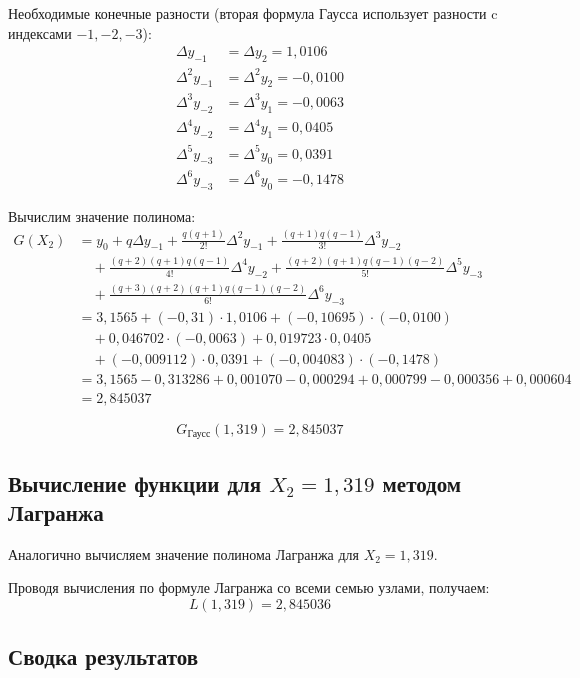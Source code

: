 Необходимые конечные разности (вторая формула Гаусса использует разности c индексами $-1, -2, -3$):
\begin{align*}
\Delta y_{-1} &= \Delta y_2 = 1{,}0106 \\
\Delta^2 y_{-1} &= \Delta^2 y_2 = -0{,}0100 \\
\Delta^3 y_{-2} &= \Delta^3 y_1 = -0{,}0063 \\
\Delta^4 y_{-2} &= \Delta^4 y_1 = 0{,}0405 \\
\Delta^5 y_{-3} &= \Delta^5 y_0 = 0{,}0391 \\
\Delta^6 y_{-3} &= \Delta^6 y_0 = -0{,}1478
\end{align*}

Вычислим значение полинома:
\begin{align*}
G(X_2) &= y_0 + q\Delta y_{-1} + \frac{q(q+1)}{2!}\Delta^2 y_{-1} + \frac{(q+1)q(q-1)}{3!}\Delta^3 y_{-2} \\
&\quad + \frac{(q+2)(q+1)q(q-1)}{4!}\Delta^4 y_{-2} + \frac{(q+2)(q+1)q(q-1)(q-2)}{5!}\Delta^5 y_{-3} \\
&\quad + \frac{(q+3)(q+2)(q+1)q(q-1)(q-2)}{6!}\Delta^6 y_{-3} \\
&= 3{,}1565 + (-0{,}31) \cdot 1{,}0106 + (-0{,}10695) \cdot (-0{,}0100) \\
&\quad + 0{,}046702 \cdot (-0{,}0063) + 0{,}019723 \cdot 0{,}0405 \\
&\quad + (-0{,}009112) \cdot 0{,}0391 + (-0{,}004083) \cdot (-0{,}1478) \\
&= 3{,}1565 - 0{,}313286 + 0{,}001070 - 0{,}000294 + 0{,}000799 - 0{,}000356 + 0{,}000604 \\
&= 2{,}845037
\end{align*}

\[
\boxed{G_{\text{Гаусс}}(1{,}319) = 2{,}845037}
\]

\subsection{Вычисление функции для $X_2 = 1{,}319$ методом Лагранжа}

Аналогично вычисляем значение полинома Лагранжа для $X_2 = 1{,}319$.

Проводя вычисления по формуле Лагранжа со всеми семью узлами, получаем:
\[
\boxed{L(1{,}319) = 2{,}845036}
\]

\subsection{Сводка результатов}

